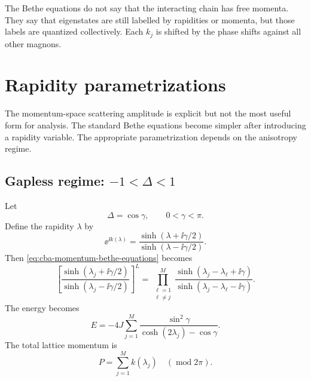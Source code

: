 \begin{remark}
The Bethe equations do not say that the interacting chain has free momenta.  They
say that eigenstates are still labelled by rapidities or momenta, but those
labels are quantized collectively.  Each $k_j$ is shifted by the phase shifts
against all other magnons.
\end{remark}

\section{Rapidity parametrizations}
\label{sec:cba-rapidity-parametrizations}

The momentum-space scattering amplitude is explicit but not the most useful form
for analysis.  The standard Bethe equations become simpler after introducing a
rapidity variable.  The appropriate parametrization depends on the anisotropy
regime.

\subsection*{Gapless regime: $-1<\Delta<1$}

Let
\begin{equation}
\label{eq:cba-gapless-parametrization}
    \Delta=\cos\gamma,
    \qquad
    0<\gamma<\pi .
\end{equation}
Define the rapidity $\lambda$ by
\begin{equation}
\label{eq:cba-gapless-momentum-rapidity-map}
    \ee^{\ii k(\lambda)}
    =
    \frac{\sinh(\lambda+\ii\gamma/2)}
         {\sinh(\lambda-\ii\gamma/2)} .
\end{equation}
Then \cref{eq:cba-momentum-bethe-equations} becomes
\begin{equation}
\label{eq:cba-gapless-xxz-bethe-equations}
    \left[
    \frac{\sinh(\lambda_j+\ii\gamma/2)}
         {\sinh(\lambda_j-\ii\gamma/2)}
    \right]^L
    =
    \prod_{\substack{\ell=1\\ \ell\neq j}}^{M}
    \frac{\sinh(\lambda_j-\lambda_\ell+\ii\gamma)}
         {\sinh(\lambda_j-\lambda_\ell-\ii\gamma)} .
\end{equation}
The energy becomes
\begin{equation}
\label{eq:cba-gapless-energy-rapidity}
    E
    =
    -4J\sum_{j=1}^{M}
    \frac{\sin^2\gamma}{\cosh(2\lambda_j)-\cos\gamma} .
\end{equation}
The total lattice momentum is
\begin{equation}
\label{eq:cba-total-momentum}
    P
    =
    \sum_{j=1}^{M}k(\lambda_j)
    \quad (\operatorname{mod} 2\pi).
\end{equation}

